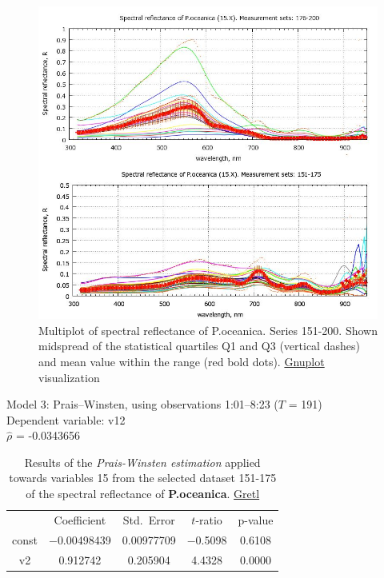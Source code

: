 \documentclass[10pt, a4paper]{article}
\begin{document}
\begin{appendices}
\begin{figure}[H]
	\begin{center}
		\includegraphics[scale=0.38]{GNU-15.jpg}
		\caption{Multiplot of spectral reflectance of P.oceanica. Series 151-200. Shown midspread of the statistical quartiles Q1 and Q3 (vertical dashes) and mean value within the range (red bold dots). \href{http://www.gnuplot.info/}{Gnuplot} visualization­}
		\label{fig:A.28}
	\end{center}
\end{figure}
\pagebreak

\begin{table}[H]
	\begin{center}
	\caption{Results of the \textit{Prais-Winsten estimation} applied towards variables 15 from the selected dataset 151-175 of the spectral reflectance of \textbf{P.oceanica}. \href{http://gretl.sourceforge.net/}{Gretl}}
	\label{tab:26}
		Model 3: Prais--Winsten, using observations 1:01--8:23 ($T$ = 191)\\
		Dependent variable: v12\\
	$\hat{\rho}$ = -0.0343656

	\vspace{1em}

	\begin{tabular}{|c c c c c|}
		  & {Coefficient} &  {Std.\ Error} & {$t$-ratio} &   {p-value} \\[1ex]
		const &   $-$0.00498439 &     0.00977709 &       $-$0.5098 &         0.6108 \\
		v2 &   0.912742 &     0.205904 &      4.4328 &         0.0000 \\
	\end{tabular}


\end{center}
\end{table}
\end{appendices}
\end{document}

